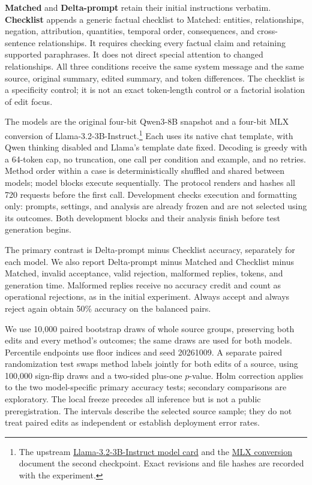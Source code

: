 \documentclass[10pt,letterpaper,twocolumn]{article}
\makeatletter
\renewcommand{\subsection}{\@startsection{subsection}{2}{0pt}{-1.8ex plus -.5ex minus -.2ex}{.8ex plus .2ex}{\normalfont\normalsize\bfseries\raggedright}}
\makeatother
\begin{document}
\textbf{Matched} and \textbf{Delta-prompt} retain their initial instructions verbatim. \textbf{Checklist} appends a generic factual checklist to Matched: entities, relationships, negation, attribution, quantities, temporal order, consequences, and cross-sentence relationships. It requires checking every factual claim and retaining supported paraphrases. It does not direct special attention to changed relationships. All three conditions receive the same system message and the same source, original summary, edited summary, and token differences. The checklist is a specificity control; it is not an exact token-length control or a factorial isolation of edit focus.

The models are the original four-bit Qwen3-8B snapshot and a four-bit MLX conversion of Llama-3.2-3B-Instruct.\footnote{The upstream \href{https://huggingface.co/meta-llama/Llama-3.2-3B-Instruct}{Llama-3.2-3B-Instruct model card} and the \href{https://huggingface.co/mlx-community/Llama-3.2-3B-Instruct-4bit}{MLX conversion} document the second checkpoint. Exact revisions and file hashes are recorded with the experiment.} Each uses its native chat template, with Qwen thinking disabled and Llama's template date fixed. Decoding is greedy with a 64-token cap, no truncation, one call per condition and example, and no retries. Method order within a case is deterministically shuffled and shared between models; model blocks execute sequentially. The protocol renders and hashes all 720 requests before the first call. Development checks execution and formatting only: prompts, settings, and analysis are already frozen and are not selected using its outcomes. Both development blocks and their analysis finish before test generation begins.

\subsection{Paired Analysis}
The primary contrast is Delta-prompt minus Checklist accuracy, separately for each model. We also report Delta-prompt minus Matched and Checklist minus Matched, invalid acceptance, valid rejection, malformed replies, tokens, and generation time. Malformed replies receive no accuracy credit and count as operational rejections, as in the initial experiment. Always accept and always reject again obtain 50\% accuracy on the balanced pairs.

We use 10,000 paired bootstrap draws of whole source groups, preserving both edits and every method's outcomes; the same draws are used for both models. Percentile endpoints use floor indices and seed 20261009. A separate paired randomization test swaps method labels jointly for both edits of a source, using 100,000 sign-flip draws and a two-sided plus-one $p$-value. Holm correction applies to the two model-specific primary accuracy tests; secondary comparisons are exploratory. The local freeze precedes all inference but is not a public preregistration. The intervals describe the selected source sample; they do not treat paired edits as independent or establish deployment error rates.
\end{document}
